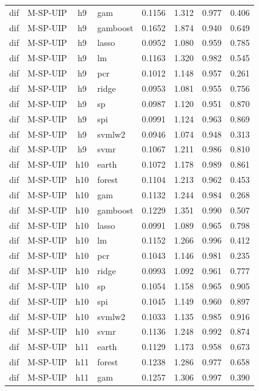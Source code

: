 \begin{ThreePartTable}
\begin{longtable}[t]{llclcccc}
dif & M-SP-UIP & h9 & gam & 0.1156 & 1.312 & 0.977 & 0.406\\
dif & M-SP-UIP & h9 & gamboost & 0.1652 & 1.874 & 0.940 & 0.649\\
dif & M-SP-UIP & h9 & lasso & 0.0952 & 1.080 & 0.959 & 0.785\\
dif & M-SP-UIP & h9 & lm & 0.1163 & 1.320 & 0.982 & 0.545\\
dif & M-SP-UIP & h9 & pcr & 0.1012 & 1.148 & 0.957 & 0.261\\
dif & M-SP-UIP & h9 & ridge & 0.0953 & 1.081 & 0.955 & 0.756\\
dif & M-SP-UIP & h9 & sp & 0.0987 & 1.120 & 0.951 & 0.870\\
dif & M-SP-UIP & h9 & spi & 0.0991 & 1.124 & 0.963 & 0.869\\
dif & M-SP-UIP & h9 & svmlw2 & 0.0946 & 1.074 & 0.948 & 0.313\\
dif & M-SP-UIP & h9 & svmr & 0.1067 & 1.211 & 0.986 & 0.810\\
\addlinespace
dif & M-SP-UIP & h10 & earth & 0.1072 & 1.178 & 0.989 & 0.861\\
dif & M-SP-UIP & h10 & forest & 0.1104 & 1.213 & 0.962 & 0.453\\
dif & M-SP-UIP & h10 & gam & 0.1132 & 1.244 & 0.984 & 0.268\\
dif & M-SP-UIP & h10 & gamboost & 0.1229 & 1.351 & 0.990 & 0.507\\
dif & M-SP-UIP & h10 & lasso & 0.0991 & 1.089 & 0.965 & 0.798\\
dif & M-SP-UIP & h10 & lm & 0.1152 & 1.266 & 0.996 & 0.412\\
dif & M-SP-UIP & h10 & pcr & 0.1043 & 1.146 & 0.981 & 0.235\\
dif & M-SP-UIP & h10 & ridge & 0.0993 & 1.092 & 0.961 & 0.777\\
dif & M-SP-UIP & h10 & sp & 0.1054 & 1.158 & 0.965 & 0.905\\
dif & M-SP-UIP & h10 & spi & 0.1045 & 1.149 & 0.960 & 0.897\\
dif & M-SP-UIP & h10 & svmlw2 & 0.1033 & 1.135 & 0.985 & 0.916\\
dif & M-SP-UIP & h10 & svmr & 0.1136 & 1.248 & 0.992 & 0.874\\
\addlinespace
dif & M-SP-UIP & h11 & earth & 0.1129 & 1.173 & 0.958 & 0.673\\
dif & M-SP-UIP & h11 & forest & 0.1238 & 1.286 & 0.977 & 0.658\\
dif & M-SP-UIP & h11 & gam & 0.1257 & 1.306 & 0.997 & 0.390\\

\end{longtable}
\end{ThreePartTable}
